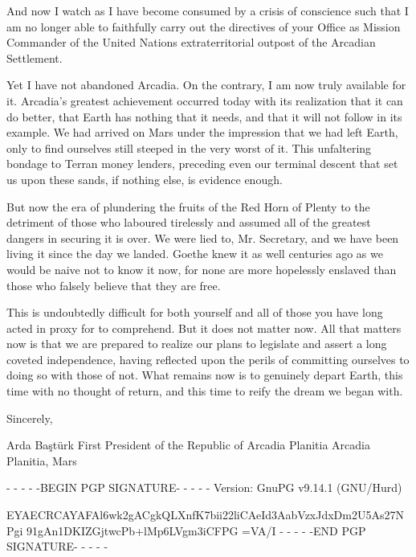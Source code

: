 And now I watch as I have become consumed by a crisis of conscience such that I am no longer able to faithfully carry out the directives of your Office as Mission Commander of the United Nations extraterritorial outpost of the Arcadian Settlement.

Yet I have not abandoned Arcadia. On the contrary, I am now truly available for it. Arcadia's greatest achievement occurred today with its realization that it can do better, that Earth has nothing that it needs, and that it will not follow in its example. We had arrived on Mars under the impression that we had left Earth, only to find ourselves still steeped in the very worst of it. This unfaltering bondage to Terran money lenders, preceding even our terminal descent that set us upon these sands, if nothing else, is evidence enough.

But now the era of plundering the fruits of the Red Horn of Plenty to the detriment of those who laboured tirelessly and assumed all of the greatest dangers in securing it is over. We were lied to, Mr. Secretary, and we have been living it since the day we landed. Goethe knew it as well centuries ago as we would be naive not to know it now, for none are more hopelessly enslaved than those who falsely believe that they are free.

This is undoubtedly difficult for both yourself and all of those you have long acted in proxy for to comprehend. But it does not matter now. All that matters now is that we are prepared to realize our plans to legislate and assert a long coveted independence, having reflected upon the perils of committing ourselves to doing so with those of not. What remains now is to genuinely depart Earth, this time with no thought of return, and this time to reify the dream we began with.

Sincerely, 

\hskip 1.5cm 
   
Arda Baştürk
First President of the Republic of Arcadia Planitia
Arcadia Planitia, Mars

- - - - -BEGIN PGP SIGNATURE- - - - -
Version: GnuPG v9.14.1 (GNU/Hurd)

EYAECRCAYAFAl6wk2gACgkQLXnfK7bii22liCAeId3AabVzxJdxDm2U5As27NPgi
91gAn1DKIZGjtwcPb+lMp6LVgm3iCFPG
=VA/I
- - - - -END PGP SIGNATURE- - - - -

